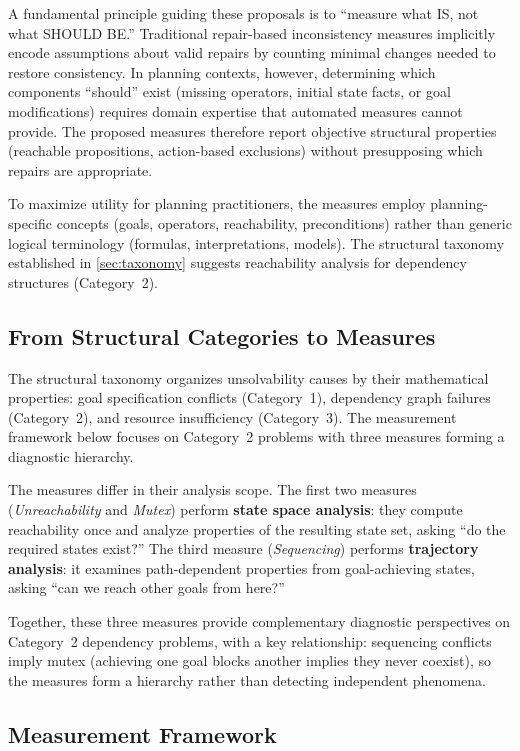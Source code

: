 A fundamental principle guiding these proposals is to ``measure what IS, not what SHOULD BE.'' Traditional repair-based inconsistency measures implicitly encode assumptions about valid repairs by counting minimal changes needed to restore consistency. In planning contexts, however, determining which components ``should'' exist (missing operators, initial state facts, or goal modifications) requires domain expertise that automated measures cannot provide. The proposed measures therefore report objective structural properties (reachable propositions, action-based exclusions) without presupposing which repairs are appropriate.

To maximize utility for planning practitioners, the measures employ planning-specific concepts (goals, operators, reachability, preconditions) rather than generic logical terminology (formulas, interpretations, models). The structural taxonomy established in \ref{sec:taxonomy} suggests reachability analysis for dependency structures (Category~2).

\subsection{From Structural Categories to Measures}

The structural taxonomy organizes unsolvability causes by their mathematical properties: goal specification conflicts (Category~1), dependency graph failures (Category~2), and resource insufficiency (Category~3). The measurement framework below focuses on Category~2 problems with three measures forming a diagnostic hierarchy.

The measures differ in their analysis scope. The first two measures (\emph{Unreachability} and \emph{Mutex}) perform \textbf{state space analysis}: they compute reachability once and analyze properties of the resulting state set, asking ``do the required states exist?'' The third measure (\emph{Sequencing}) performs \textbf{trajectory analysis}: it examines path-dependent properties from goal-achieving states, asking ``can we reach other goals from here?''

Together, these three measures provide complementary diagnostic perspectives on Category~2 dependency problems, with a key relationship: sequencing conflicts imply mutex (achieving one goal blocks another implies they never coexist), so the measures form a hierarchy rather than detecting independent phenomena.

\subsection{Measurement Framework}

